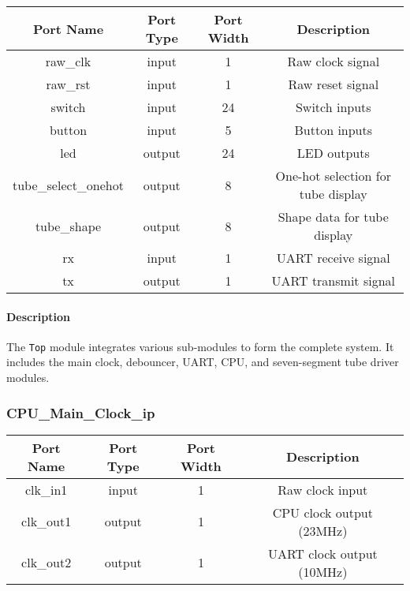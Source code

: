 \documentclass[a4paper,12pt]{article}
\begin{document}
\begin{center}
    \begin{tabular}{cccc}
        \toprule
        \textbf{Port Name} & \textbf{Port Type} & \textbf{Port Width} & \textbf{Description} \\
        \midrule
        raw\_clk & input & 1 & Raw clock signal \\
        raw\_rst & input & 1 & Raw reset signal \\
        switch & input & 24 & Switch inputs \\
        button & input & 5 & Button inputs \\
        led & output& 24 & LED outputs \\
        tube\_select\_onehot & output & 8 & One-hot selection for tube display \\
        tube\_shape & output & 8 & Shape data for tube display \\
        rx & input & 1 & UART receive signal \\
        tx & output & 1 & UART transmit signal \\
        \bottomrule
    \end{tabular}
\end{center}


\paragraph{Description}
The \texttt{Top} module integrates various sub-modules to form the complete system. It includes the main clock, debouncer, UART, CPU, and seven-segment tube driver modules.

\subsubsection{CPU\_Main\_Clock\_ip}

\begin{center}
    \begin{tabular}{cccc}
        \toprule
        \textbf{Port Name} & \textbf{Port Type} & \textbf{Port Width} & \textbf{Description} \\
        \midrule
        clk\_in1  & input  & 1 & Raw clock input \\
        clk\_out1 & output & 1 & CPU clock output (23MHz) \\
        clk\_out2 & output & 1 & UART clock output (10MHz) \\
        \bottomrule
    \end{tabular}
\end{center}
\end{document}
